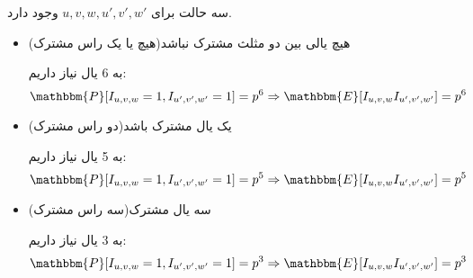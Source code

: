 \documentclass[11pt]{article}
\begin{document}
\begin{persian}
سه حالت برای 
$u,v,w,u',v',w'$
وجود دارد.
\begin{itemize}
\item هیچ یالی بین دو مثلث مشترک نباشد(هیچ یا یک راس مشترک)

به 6 یال نیاز داریم:
$$
\mathbbm{P}[I_{u,v,w} = 1,I_{u',v',w'}=1] = p^6 \Rightarrow \mathbbm{E}[I_{u,v,w}I_{u',v',w'}] = p^6
$$ 
\item یک یال مشترک باشد(دو راس مشترک)

به 5  یال نیاز داریم:
$$
\mathbbm{P}[I_{u,v,w} = 1,I_{u',v',w'}=1] = p^5 \Rightarrow \mathbbm{E}[I_{u,v,w}I_{u',v',w'}] = p^5
$$
\item سه یال مشترک(سه راس مشترک)

به 3 یال نیاز داریم:
$$
\mathbbm{P}[I_{u,v,w} = 1,I_{u',v',w'}=1] = p^3 \Rightarrow \mathbbm{E}[I_{u,v,w}I_{u',v',w'}] = p^3
$$
\end{itemize}


\end{persian}
\end{document}
